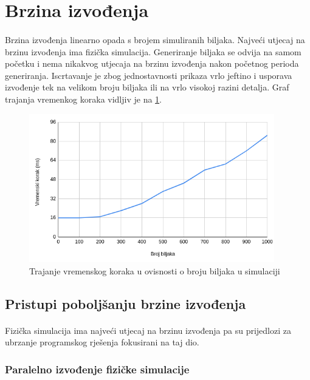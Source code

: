 \documentclass[times, utf8, diplomski]{fer}
\begin{document}
\section{Brzina izvođenja}
\paragraph{}
Brzina izvođenja linearno opada s brojem simuliranih biljaka. Najveći utjecaj na 
brzinu izvođenja ima fizička simulacija. Generiranje biljaka se odvija na samom 
početku i nema nikakvog utjecaja na brzinu izvođenja nakon početnog perioda 
generiranja. Iscrtavanje je zbog jednostavnosti prikaza vrlo jeftino i usporava
izvođenje tek na velikom broju biljaka ili na vrlo visokoj razini detalja. Graf trajanja 
vremenkog koraka vidljiv je na \ref{fig:53-1}.

\begin{figure}[h]
	\centering
	\includegraphics[width=0.95\textwidth]{img/53-1}
	\caption{Trajanje vremenskog koraka u ovisnosti o broju biljaka u simulaciji}
	\label{fig:53-1}
\end{figure}

\subsection{Pristupi poboljšanju brzine izvođenja}
\paragraph{}
Fizička simulacija ima najveći utjecaj na brzinu izvođenja pa su prijedlozi za 
ubrzanje programskog rješenja fokusirani na taj dio.
\subsubsection{Paralelno izvođenje fizičke simulacije}
\end{document}
